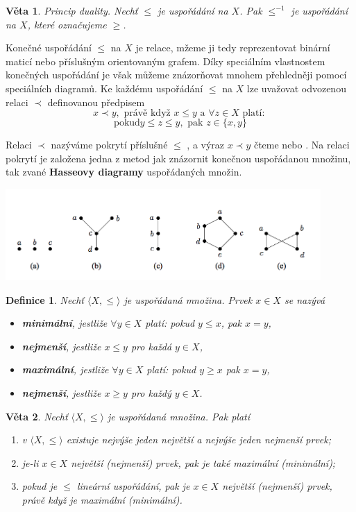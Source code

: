 \documentclass[12pt,a4paper]{article}
\newtheorem{definition}{Definice}
\newtheorem{sentence}{Věta}
\begin{document}
\begin{sentence}
	Princip duality. Nechť $\leq$ je uspořádání na $X$. Pak $\leq^{-1}$ je uspořádání na $X$, které označujeme $\geq$.
\end{sentence}

Konečné uspořádání $\leq$ na $X$ je relace, mžeme ji tedy reprezentovat binární maticí nebo příslušným orientovaným grafem. Díky speciálním vlastnostem konečných uspořádání je však můžeme znázorňovat mnohem přehledněji pomocí speciálních diagramů. Ke každému uspořádání $\leq$ na $X$ lze uvažovat odvozenou relaci $\prec$ definovanou předpisem
$$x \prec y, \text{ právě když } x \leq y \text{ a } \forall z \in X \text{ platí: }$$
$$\text{pokud} y \leq z \leq y, \text{ pak } z \in \{ x, y\}$$



Relaci $\prec$ nazýváme pokrytí příslušné $\leq$ , a výraz $x \prec y$ čteme  nebo . Na relaci pokrytí je založena jedna z metod jak znázornit konečnou uspořádanou množinu, tak zvané \textbf{Hasseovy diagramy} uspořádaných množin.

\begin{center}
	\includegraphics[width=12cm]{img/HasseDiagrams}
\end{center}

\begin{definition}
	Nechť $\langle X, \leq \rangle$ je uspořádaná množina. Prvek $x \in X$ se nazývá
	\begin{itemize}
		\item \textbf{minimální}, jestliže $\forall y \in X$ platí: pokud $y \leq x$, pak $x = y$,
		\item \textbf{nejmenší}, jestliže $x \leq y$ pro každá $y \in X$,
		\item \textbf{maximální}, jestliže $\forall y \in X$ platí: pokud $y \geq x$ pak $x = y$,
		\item \textbf{nejmenší}, jestliže $x \geq y$ pro každý $y \in X$.
	\end{itemize}
\end{definition}

\begin{sentence}
	Nechť $\langle X, \leq \rangle$ je uspořádaná množina. Pak platí
	\begin{enumerate}
		\item v $\langle X, \leq \rangle$ existuje nejvýše jeden největší a nejvýše jeden nejmenší prvek;
		\item je-li $x \in X$ největší (nejmenší) prvek, pak je také maximální (minimální);
		\item pokud je $\leq$ lineární uspořádání, pak je $x \in X$ největší (nejmenší) prvek, právě když je maximální (minimální).
	\end{enumerate}
\end{sentence}
\end{document}
